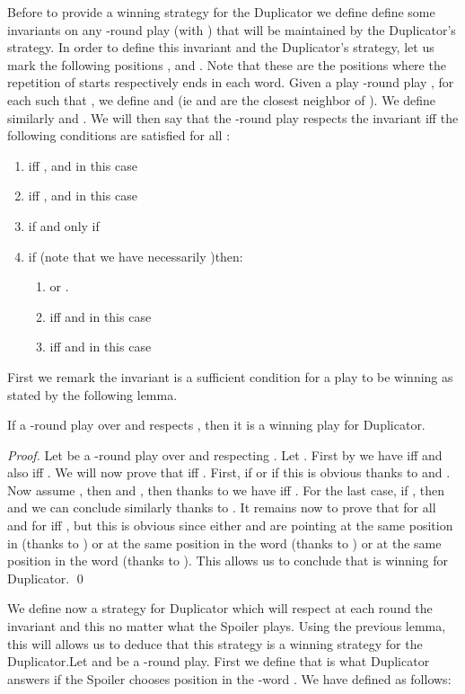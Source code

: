 Before to provide a winning strategy for the Duplicator we define define some invariants on any -round play (with ) that will be maintained by the Duplicator's strategy. In order to define this invariant and the Duplicator's strategy, let us mark the following positions ,
 and . Note that these are the positions where the repetition of  starts
respectively ends in each word.
 Given a play -round play , for each  such that , we define  and  (ie  and  are the closest neighbor of ). We define similarly  and . We will then say that the -round play  respects the invariant  iff the following conditions are satisfied for all :
\begin{enumerate}
  \item  iff  , and in this case   
  \item  iff , and in this case 
  \item  if and only if 
  \item if  (note that we have necessarily  )then:
    \begin{enumerate}
      \item   or .
      \item  iff   and in this case 
      \item  iff   and in this case  


    \end{enumerate}
\end{enumerate}
First we remark the invariant  is a sufficient condition for a play to be winning as stated by the following lemma.
\begin{lemma}
\label{lem-inv}
If a -round play over  and  respects , then it is a winning play for Duplicator.
\end{lemma}
\begin{proof}
Let  be a -round play over  and  respecting . Let . First by  we have  iff  and also  iff . We will now prove that  iff . First, if   or if   this is obvious thanks to  and . Now assume , then  and , then thanks to  we have  iff .  For the last case, if , then  and we can conclude similarly thanks to . It remains now to prove that for all  and for   iff , but this is obvious since either  and  are pointing at the same position in  (thanks to ) or at the same position in the word  (thanks to ) or at the same position in the word  (thanks to  ). This allows us to conclude that  is winning for Duplicator. \qed
\end{proof}
We define now a strategy  for Duplicator which will respect at each round the invariant  and this no matter what the Spoiler plays. Using the previous lemma, this will allows us to deduce that this strategy is a winning strategy for the Duplicator.Let  and  be a -round play. First we define  that is what Duplicator answers if the Spoiler chooses position  in the -word . We have  defined as follows:
